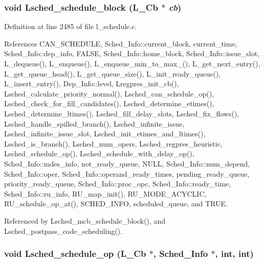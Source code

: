 \subsubsection{\setlength{\rightskip}{0pt plus 5cm}void Lsched\_\-schedule\_\-block (L\_\-Cb $\ast$ {\em cb})}\label{l__schedule_8h_7d9e535e6ceefbc9b8be92d3349d67a0}




Definition at line 2485 of file l\_\-schedule.c.

References CAN\_\-SCHEDULE, Sched\_\-Info::current\_\-block, current\_\-time, Sched\_\-Info::dep\_\-info, FALSE, Sched\_\-Info::home\_\-block, Sched\_\-Info::issue\_\-slot, L\_\-dequeue(), L\_\-enqueue(), L\_\-enqueue\_\-min\_\-to\_\-max\_(), L\_\-get\_\-next\_\-entry(), L\_\-get\_\-queue\_\-head(), L\_\-get\_\-queue\_\-size(), L\_\-init\_\-ready\_\-queue(), L\_\-insert\_\-entry(), Dep\_\-Info::level, Lregpres\_\-init\_\-cb(), Lsched\_\-calculate\_\-priority\_\-normal(), Lsched\_\-can\_\-schedule\_\-op(), Lsched\_\-check\_\-for\_\-fill\_\-candidates(), Lsched\_\-determine\_\-etimes(), Lsched\_\-determine\_\-ltimes(), Lsched\_\-fill\_\-delay\_\-slots, Lsched\_\-fix\_\-flows(), Lsched\_\-handle\_\-spilled\_\-branch(), Lsched\_\-infinite\_\-issue, Lsched\_\-infinite\_\-issue\_\-slot, Lsched\_\-init\_\-etimes\_\-and\_\-ltimes(), Lsched\_\-is\_\-branch(), Lsched\_\-num\_\-opers, Lsched\_\-regpres\_\-heuristic, Lsched\_\-schedule\_\-op(), Lsched\_\-schedule\_\-with\_\-delay\_\-op(), Sched\_\-Info::mdes\_\-info, not\_\-ready\_\-queue, NULL, Sched\_\-Info::num\_\-depend, Sched\_\-Info::oper, Sched\_\-Info::operand\_\-ready\_\-times, pending\_\-ready\_\-queue, priority\_\-ready\_\-queue, Sched\_\-Info::proc\_\-opc, Sched\_\-Info::ready\_\-time, Sched\_\-Info::ru\_\-info, RU\_\-map\_\-init(), RU\_\-MODE\_\-ACYCLIC, RU\_\-schedule\_\-op\_\-at(), SCHED\_\-INFO, scheduled\_\-queue, and TRUE.

Referenced by Lsched\_\-mcb\_\-schedule\_\-block(), and Lsched\_\-postpass\_\-code\_\-scheduling().
\subsubsection{\setlength{\rightskip}{0pt plus 5cm}void Lsched\_\-schedule\_\-op (L\_\-Cb $\ast$, \bf{Sched\_\-Info} $\ast$, int, int)}\label{l__schedule_8h_08764d633a209aeda43dfd64245ec30f}





